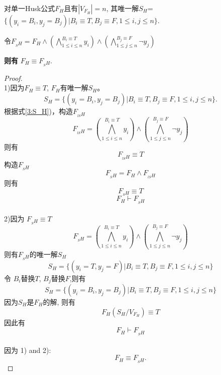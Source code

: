 \begin{lemma}\label{3:SHE}

对单一Husk公式${F_H}$且有$|V_{F_H}|= n$,
其唯一解$S_H$=$\{(y_i=B_i,y_j=B_j)|B_i\equiv T, B_j\equiv F, 1\leqslant i, j\leqslant n \}$.

令$F_{_SH}=F_H\wedge (\bigwedge_{1\leqslant i\leqslant n}^{B_i\equiv T}y_i)\wedge(\bigwedge_{1\leqslant j\leqslant n}^{B_j\equiv F}\neg y_j)$

\textbf{则有} $F_H \equiv F_{_SH}$.
\end{lemma}
\begin{proof}~\\
1)因为$F_H\equiv T$, $F_H$有唯一解$S_H$。
 \begin{equation}\label{3:S_H}
 S_H=\{(y_i=B_i,y_j=B_j)|B_i\equiv T, B_j\equiv F, 1\leqslant i, j\leqslant n \}.
\end{equation}
根据式\ref{3:S_H})，构造$F_{_{lS}H}$
\begin{equation}
 F_{_{lS}H}=(\bigwedge_{1\leqslant i\leqslant n}^{B_i\equiv T}y_i)\wedge(\bigwedge_{1\leqslant j\leqslant n}^{B_j\equiv F}\neg y_j)
\end{equation}
则有
\begin{equation}
 F_{_{lS}H} \equiv T
\end{equation}
构造$F_{_SH}$
\begin{equation}
 F_{_SH}=F_H\wedge F_{_{lS}H}
\end{equation}
则有
\begin{equation}
 F_{_SH} \equiv T
\end{equation}
\begin{equation}
 F_H \vdash F_{_SH}
\end{equation}\\
2)因为 $F_{_SH}\equiv T$
\begin{equation}
F_{_SH}=(\bigwedge_{1\leqslant i\leqslant n }^{B_i\equiv T}y_i)\wedge(\bigwedge_{1\leqslant j\leqslant n}^{B_j\equiv F}\neg y_j)
\end{equation}
则有$F_{_SH}$的唯一解$S_H$
\begin{equation}
S_H=\{(y_i=T,y_j=F)|B_i\equiv T, B_j\equiv F, 1\leqslant i, j\leqslant n \}
\end{equation}
令 $B_i$替换$T$, $B_j$替换$F$,则有
 \begin{equation}
S_H=\{(y_i=B_i,y_j=B_j)|B_i\equiv T, B_j\equiv F, 1\leqslant i, j\leqslant n \}
 \end{equation}
因为$S_H$是$F_H$的解, 则有
\begin{equation}
F_H(S_H/V_{F_H})\equiv T
\end{equation}
 因此有
 \begin{equation}
  F_H \vdash F_{_SH}
 \end{equation}
 \\
因为 1) and 2):
\begin{equation}
 F_H \equiv F_{_SH}.
\end{equation}
\end{proof}

